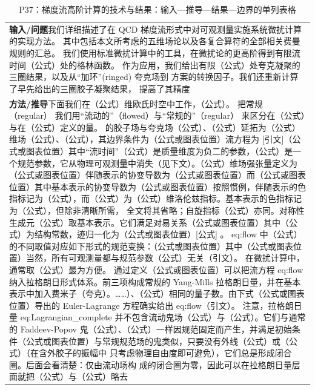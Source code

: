 \documentclass[UTF8,11pt,oneside]{ctexbook}
\begin{document}
\begin{table}[htbp]
  \centering
  \caption*{P37：梯度流高阶计算的技术与结果：输入—推导—结果—边界的单列表格}
  \small
  \begin{tabular}{@{}p{}@{}}
    \toprule
    \textbf{输入/问题}\quad 我们详细描述了在 QCD 梯度流形式中对可观测量实施系统微扰计算的实现方法。 其中包括本文所考虑的五维场论以及各复合算符的全部相关费曼规则的汇总。 我们使用标准微扰计算中的工具，在微扰论的更高阶得到有限流时间（公式）处的格林函数。 作为应用，我们给出有限（公式）处夸克凝聚的三圈结果，以及从``加环''(ringed) 夸克场到 方案的转换因子。我们还重新计算了早先给出的三圈胶子凝聚结果， 提高了其精度 \\
    \textbf{方法/推导}\quad 下面我们在（公式）维欧氏时空中工作，（公式）。 把常规 （regular） 我们用``流动的''（flowed）与``常规的''（regular） 来区分在（公式）与在（公式）定义的量。 的胶子场与夸克场（公式）、（公式）延拓为（公式）维场（公式）、（公式），其边界条件为（公式或图表位置）流方程为 [引文]（公式或图表位置）其中``流时间''（公式）是质量维度为负二的参数，（公式）是一个规范参数，它从物理可观测量中消失（见下文）。（公式）维场强张量定义为（公式或图表位置）伴随表示的协变导数为（公式或图表位置）而（公式或图表位置）其中基本表示的协变导数为（公式或图表位置）按照惯例，伴随表示的色指标记为（公式），而（公式）为（公式）维洛伦兹指标。基本表示的色指标记为（公式），但除非清晰所需， 全文将其省略；自旋指标（公式）亦同。对称性生成元（公式）取基本表示。它们满足对易关系（公式或图表位置）其中（公式）为结构常数，迹归一化为（公式或图表位置）[公式] 。 eq:flow 中（公式）的不同取值对应如下形式的规范变换：（公式或图表位置）其中（公式或图表位置）当然，所有可观测量都与规范参数（公式）无关（引文）。 在微扰计算中，通常取（公式）最为方便。 通过定义（公式或图表位置）可以把流方程 eq:flow 纳入拉格朗日形式体系。前三项构成常规的 Yang-Mills 拉格朗日量，并在基本表示中加入费米子（夸克）。……）、（公式）相同的量子数。由下式（公式或图表位置）导出的 Euler-Lagrange 方程确实给出 eq:flow（引文）。 注意，拉格朗日量 eq:Lagrangian\_complete 并不包含流动鬼场（公式）与（公式）。它们与通常的 Faddeev-Popov 鬼（公式）、（公式）一样因规范固定而产生，并满足初始条件（公式或图表位置）与常规规范场的鬼类似，只要没有外线（公式）或（公式）（在含外胶子的振幅中 只考虑物理自由度即可避免），它们总是形成闭合圈。后面会看清楚：仅由流动场构 成的闭合圈为零，因此可以在拉格朗日量层面就把（公式）与（公式）略去 \\

\end{tabular}
\end{table}
\end{document}
